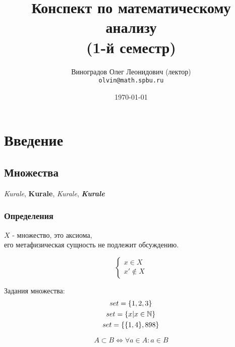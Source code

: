 \documentclass[12pt, a4paper]{article}
\title{Конспект по математическому анализу \\(1-й семестр)}
\author{
  \vova
  \and
  Виноградов Олег Леонидович (лектор)\\
  \texttt{olvin@math.spbu.ru}
}
\date{\today}
\begin{document}
     \maketitle
     \newpage
     \tableofcontents
     \newpage
    

    \section{Введение}
    
    \subsection{Множества}
    
    \textit{Kurale}, 
    \textbf{Kurale},
    \textsl{Kurale},
    \textit{\textbf{Kurale}}


    \subsubsection{Определения} 
    
    \begin{definition}[Множество]
      $X$ - множество, это аксиома, \\
      его метафизическая сущность не подлежит обсуждению.  
    \end{definition}
    
    \begin{equation}
      \begin{cases}
        x \in X \\
        x' \notin X
      \end{cases}
    \end{equation}

    \begin{example}
      Задания множества: 
      \begin{gather}
        set = \{1, 2, 3\} \\
        set = \{x | x \in {\mathbb{N}}\} \\
        set = \{\{1, 4\}, 898\}
      \end{gather}
    \end{example}
    
    \begin{definition}[Подмножество]
      \begin{equation}
        A \subset B \Longleftrightarrow \forall a \in A: a \in B
      \end{equation}
    \end{definition}
\end{document}
